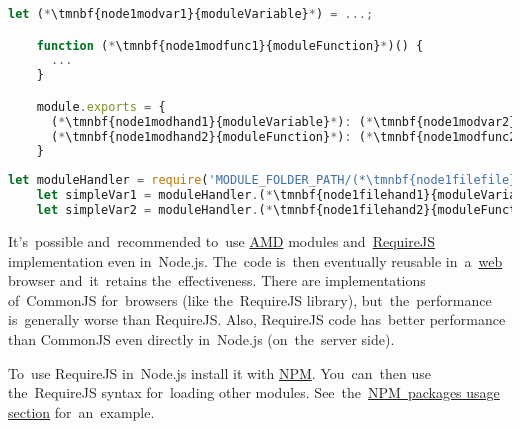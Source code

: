 \enlargethispage{20mm}
\thispagestyle{empty}
\begin{lstlisting}[language=JavaScript,title={Module file \mbit{\tmnbf{node1modfile}{moduleFile}.js}}]
    let (*\tmnbf{node1modvar1}{moduleVariable}*) = ...;

    function (*\tmnbf{node1modfunc1}{moduleFunction}*)() {
      ...
    }

    module.exports = {
      (*\tmnbf{node1modhand1}{moduleVariable}*): (*\tmnbf{node1modvar2}{moduleVariable}*),
      (*\tmnbf{node1modhand2}{moduleFunction}*): (*\tmnbf{node1modfunc2}{moduleFunction}*)
    }
\end{lstlisting}
\begin{lstlisting}[language=JavaScript,title={JavaScript executable file using the~module}]
    let moduleHandler = require('MODULE_FOLDER_PATH/(*\tmnbf{node1filefile}{moduleFile}[ForestGreen]*)');
    let simpleVar1 = moduleHandler.(*\tmnbf{node1filehand1}{moduleVariable}*); // Using module variable
    let simpleVar2 = moduleHandler.(*\tmnbf{node1filehand2}{moduleFunction}*)(); // Using module function
\end{lstlisting}
\newpage

\note It's~possible and~recommended to~use \hyperref[amd]{AMD} modules and~\hyperref[requrejs]{RequireJS} implementation even in~Node.js.
The~code is~then eventually reusable in~a~\hyperref[internetweb]{web} browser and~it~retains the~effectiveness.
There are implementations of~CommonJS for~browsers (like the~RequireJS library), but~the~performance is~generally worse than RequireJS\@.
Also, RequireJS code has~better performance than CommonJS even directly in~Node.js (on~the~server side).

To~use RequireJS in~Node.js install it with \hyperref[npm]{NPM}.
You~can~then use the~RequireJS syntax for~loading other modules.
See~the~\hyperref[npmpackageusage]{NPM~packages usage section} for~an~example.
